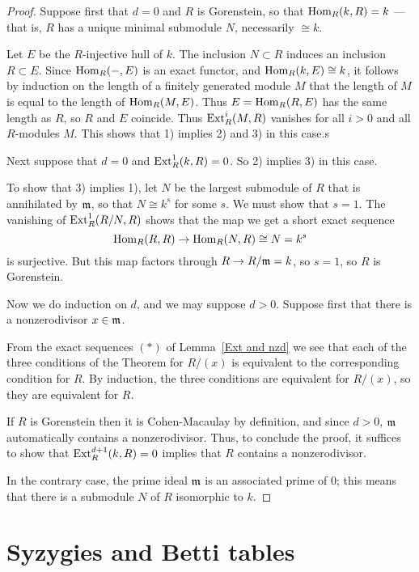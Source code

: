 \begin{proof} 
Suppose first that $d=0$ and $R$ is Gorenstein, so that $\Hom_{R}(k,R) = k$ ---that is, $R$ has a unique minimal submodule $N$, necessarily $\cong k$.

Let $E$ be the $R$-injective hull of $k$. The inclusion $N\subset R$ induces an inclusion $R\subset E$. Since
$\Hom_{R}(-, E)$ is an exact functor, and $\Hom_{R}(k, E)\cong k$, it follows by induction on the length of a finitely generated module $M$ that the length of $M$ is equal to the length of $\Hom_{R}(M, E)$.  Thus
$E = \Hom_{R}(R,E)$ has the same length as $R$, so $R$ and $E$ coincide. Thus $\Ext^{i}_{R}(M,R)$ vanishes for all $i>0$ and all $R$-modules $M$. This shows that 1) implies 2) and 3) in this case.s

Next suppose that $d=0$ and $\Ext^{1}_{R}(k,R) = 0$. So 2) implies 3) in this case.

To show that 3) implies 1), let $N$ be the largest submodule of $R$ that is annihilated by $\gm$, so that $N \cong k^{s}$ for some $s$. We must show that $s = 1$. 
The vanishing of $\Ext^{1}_{R}(R/N,R)$ shows that the map we get a short exact sequence
$$
\Hom_{R}(R,R) \to \Hom_{R}(N, R) \cong N = k^{s}
$$
is surjective. But this map factors through $R\to R/\gm = k$, so $s=1$, so $R$ is Gorenstein.

Now we do induction on $d$,  and we may suppose $d>0$. Suppose first that  there is a nonzerodivisor $x\in \gm$.

 From the exact sequences $(*)$ of Lemma~\ref{Ext and nzd} we see that each of the three conditions of the
Theorem for $R/(x)$ is equivalent to the corresponding condition for $R$. By induction, the three conditions are
equivalent for $R/(x)$, so they are equivalent for $R$.

If $R$ is Gorenstein then it is Cohen-Macaulay by definition, and since $d>0$, $\gm$ automatically contains a nonzerodivisor. Thus, to conclude the proof, it suffices to show that $\Ext_{R}^{d+1}(k,R) = 0$ implies that $R$ contains a nonzerodivisor.

In the contrary case, the prime ideal $\gm$ is an associated prime of 0; this means that there is a submodule $N$ of $R$ isomorphic to $k$.
\end{proof}


\section{Syzygies and Betti tables}

